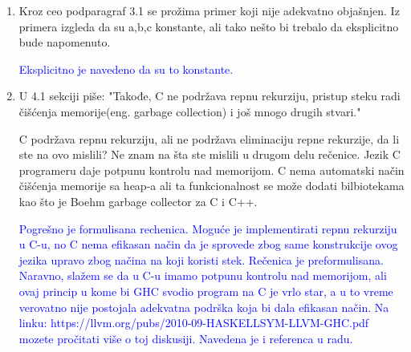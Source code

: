 \documentclass[a4paper]{report}
\newcommand{\odgovor}[1]{\textcolor{blue}{#1}}
\begin{document}
\begin{enumerate}
		\item Kroz ceo podparagraf 3.1 se prožima primer koji nije adekvatno objašnjen. Iz primera izgleda da su a,b,c konstante, ali tako nešto bi trebalo da eksplicitno bude napomenuto.
		
		\odgovor{Eksplicitno je navedeno da su to konstante.}
		
		\item U 4.1 sekciji piše:
		"Takođe, C ne podržava repnu rekurziju, pristup steku radi čišćenja memorije(eng. garbage collection) i još mnogo drugih stvari."
		
		C podržava repnu rekurziju, ali ne podržava eliminaciju repne rekurzije, da li ste na ovo mislili? Ne znam na šta ste mislili u drugom delu rečenice. Jezik C programeru daje potpunu kontrolu nad memorijom. C nema automatski način čišćenja memorije sa heap-a ali ta funkcionalnost se može dodati bilbiotekama kao što je Boehm garbage collector za C i C++.
		
		\odgovor{Pogrešno je formulisana rechenica. Moguće je implementirati repnu rekurziju u C-u, no C nema efikasan način da je sprovede zbog same konstrukcije ovog jezika upravo zbog načina na koji koristi stek. Rečenica je preformulisana. Naravno, slažem se da u C-u imamo potpunu kontrolu nad memorijom, ali ovaj princip u kome bi GHC svodio program na C je vrlo star, a u to vreme verovatno nije postojala adekvatna podrška koja bi dala efikasan način. Na linku: https://llvm.org/pubs/2010-09-HASKELLSYM-LLVM-GHC.pdf mozete pročitati više o toj diskusiji. Navedena je i referenca u radu.}
		
		
		
	\end{enumerate}
	
\end{document}
